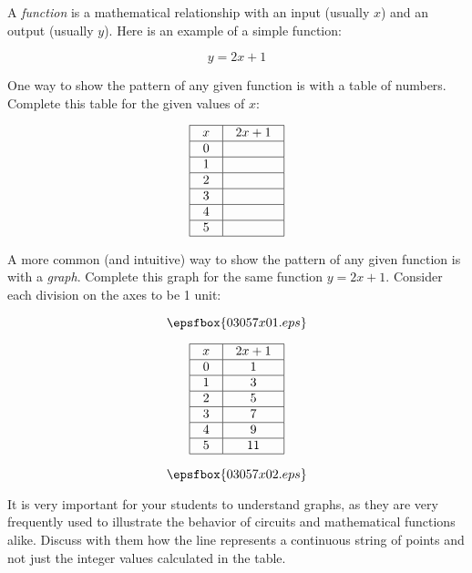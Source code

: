 

A {\it function} is a mathematical relationship with an input (usually $x$) and an output (usually $y$).  Here is an example of a simple function:

$$y = 2x + 1$$ 

One way to show the pattern of any given function is with a table of numbers.  Complete this table for the given values of $x$:


$$\vbox{\offinterlineskip
\halign{\strut
\vrule \quad\hfil # \ \hfil & 
\vrule \quad\hfil # \ \hfil \vrule \cr
\noalign{\hrule}
%
$x$ & $2x + 1$ \cr
%
\noalign{\hrule}
%
0 &  \cr
%
\noalign{\hrule}
%
1 & \cr
%
\noalign{\hrule}
%
2 &  \cr
%
\noalign{\hrule}
%
3 &  \cr
%
\noalign{\hrule}
%
4 &  \cr
%
\noalign{\hrule}
%
5 &  \cr
%
\noalign{\hrule}
} %
}$$ %

A more common (and intuitive) way to show the pattern of any given function is with a {\it graph}.  Complete this graph for the same function $y = 2x + 1$.  Consider each division on the axes to be 1 unit:

$$\epsfbox{03057x01.eps}$$








$$\vbox{\offinterlineskip
\halign{\strut
\vrule \quad\hfil # \ \hfil & 
\vrule \quad\hfil # \ \hfil \vrule \cr
\noalign{\hrule}
%
$x$ & $2x + 1$ \cr
%
\noalign{\hrule}
%
0 & 1 \cr
%
\noalign{\hrule}
%
1 & 3 \cr
%
\noalign{\hrule}
%
2 & 5 \cr
%
\noalign{\hrule}
%
3 & 7 \cr
%
\noalign{\hrule}
%
4 & 9 \cr
%
\noalign{\hrule}
%
5 & 11 \cr
%
\noalign{\hrule}
} %
}$$ %

$$\epsfbox{03057x02.eps}$$







It is very important for your students to understand graphs, as they are very frequently used to illustrate the behavior of circuits and mathematical functions alike.  Discuss with them how the line represents a continuous string of points and not just the integer values calculated in the table.




